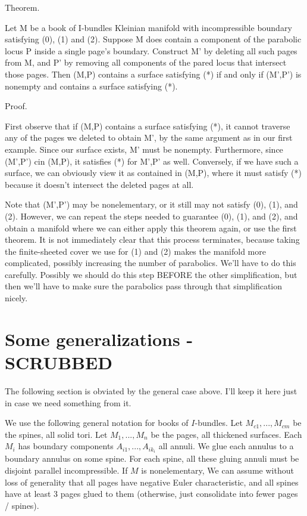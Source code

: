 \documentclass[12pt]{amsart}
\theoremstyle{definition}
\theoremstyle{remark}
\begin{document}

Theorem.

Let M be a book of I-bundles Kleinian manifold with incompressible boundary
satisfying (0), (1) and (2). Suppose M does contain a component of the
parabolic locus P inside a single page's boundary. Construct M' by deleting all
such pages from M, and P' by removing all components of the pared locus that
intersect those pages. Then (M,P) contains a surface satisfying (*) if and only
if (M',P') is nonempty and contains a surface satisfying (*).

Proof.

First observe that if (M,P) contains a surface satisfying (*), it cannot
traverse any of the pages we deleted to obtain M', by the same argument as in
our first example.  Since our surface exists, M' must be nonempty.
Furthermore, since (M',P') cin (M,P), it satisfies (*) for M',P' as well.
Conversely, if we have such a surface, we can obviously view it as contained in
(M,P), where it must satisfy (*) because it doesn't intersect the deleted pages
at all.

Note that (M',P') may be nonelementary, or it still may not satisfy (0), (1),
and (2).  However, we can repeat the steps needed to guarantee (0), (1), and
(2), and obtain a manifold where we can either apply this theorem again, or use
the first theorem. It is not immediately clear that this process terminates,
because taking the finite-sheeted cover we use for (1) and (2) makes the
manifold more complicated, possibly increasing the number of parabolics. We'll
have to do this carefully. Possibly we should do this step BEFORE the other
simplification, but then we'll have to make sure the parabolics pass through
that simplification nicely.

\section{Some generalizations - SCRUBBED}

The following section is obviated by the general case above. I'll keep it here
just in case we need something from it.

We use the following general notation for books of $I$-bundles. Let
$M_{c1},...,M_{cm}$ be the spines, all solid tori. Let $M_1,...,M_n$ be the
pages, all thickened surfaces. Each $M_i$ has boundary components
$A_{i1},...,A_{ik_i}$ all annuli. We glue each annulus to a boundary annulus on
some spine. For each spine, all these gluing annuli must be disjoint parallel
incompressible. If $M$ is nonelementary, We can assume without loss of
generality that all pages have negative Euler characteristic, and all spines
have at least 3 pages glued to them (otherwise, just consolidate into fewer
pages / spines).
\end{document}
